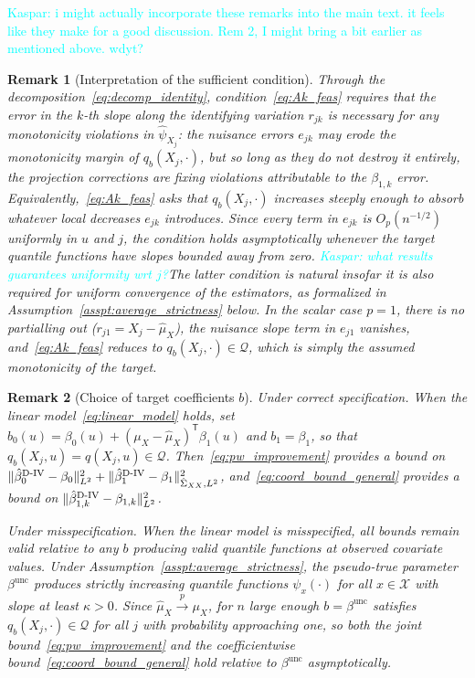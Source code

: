 \documentclass[12pt]{article}
\newcommand{\kw}[1]{\textcolor{cyan}{Kaspar: #1}}
\newcommand{\T}{\mathsf{T}} %
\newcommand{\est}{\ensuremath{\textnormal{D-IV}}\xspace}
\newcommand{\toP}{ \overset{p}{\to}}
\newtheorem{remark}{Remark}
\begin{document}
\kw{i might actually incorporate these remarks into the main text. it feels like they make for a good discussion. Rem 2, I might bring a bit earlier as mentioned above. wdyt?}
\begin{remark}[Interpretation of the sufficient condition]
\label{rem:coord_interpretation}
Through the decomposition~\eqref{eq:decomp_identity}, condition~\eqref{eq:Ak_feas} requires that the error in the $k$-th slope along the identifying variation $r_{jk}$ is \emph{necessary} for any monotonicity violations in $\hat\psi_{X_j}$: the nuisance errors $e_{jk}$ may erode the monotonicity margin of $q_b(X_j,\cdot)$, but so long as they do not destroy it entirely, the projection corrections are fixing violations attributable to the $\beta_{1,k}$ error. Equivalently,~\eqref{eq:Ak_feas} asks that $q_b(X_j,\cdot)$ increases steeply enough to absorb whatever local decreases $e_{jk}$ introduces. Since every term in $e_{jk}$ is $O_p(n^{-1/2})$ uniformly in $u$ and $j$, the condition holds asymptotically whenever the target quantile functions have slopes bounded away from zero. \kw{what results guarantees uniformity wrt $j$?}The latter condition is natural insofar it is also required for uniform convergence of the estimators, as formalized in Assumption~\ref{asspt:average_strictness} below. In the scalar case $p=1$, there is no partialling out ($r_{j1}=X_j-\hat\mu_X$), the nuisance slope term in $e_{j1}$ vanishes, and~\eqref{eq:Ak_feas} reduces to $q_b(X_j,\cdot)\in\mathcal Q$, which is simply the assumed monotonicity of the target.
\end{remark}


\begin{remark}[Choice of target coefficients $b$]
\label{rem:choice_of_reference} 
\emph{Under correct specification.}
When the linear model~\eqref{eq:linear_model} holds, set $b_0(u)=\beta_0(u)+(\mu_X-\hat\mu_X)^{\!\T}\beta_1(u)$ and $b_1=\beta_1$, so that $q_b(X_j,u)=q(X_j,u)\in\mathcal Q$. Then~\eqref{eq:pw_improvement} provides a bound on $\|\hat\beta_0^{\est}-\beta_0\|_{L^2}^2+\|\hat\beta_1^{\est}-\beta_1\|_{\hat\Sigma_{XX},L^2}^2$, and~\eqref{eq:coord_bound_general} provides a bound on $\|\hat\beta_{1,k}^{\est}-\beta_{1,k}\|_{L^2}^2$.

\emph{Under misspecification.}
When the linear model is misspecified, all bounds remain valid relative to any $b$ producing valid quantile functions at observed covariate values. Under Assumption~\ref{asspt:average_strictness}, the pseudo-true parameter $\beta^{\mathrm{unc}}$ produces strictly increasing quantile functions $\psi_x(\cdot)$ for all $x\in\mathcal X$ with slope at least $\kappa>0$. Since $\hat\mu_X\toP\mu_X$, for $n$ large enough $b=\beta^{\mathrm{unc}}$  satisfies $q_b(X_j,\cdot)\in\mathcal Q$ for all $j$ with probability approaching one, so both the joint bound~\eqref{eq:pw_improvement} and the coefficientwise bound~\eqref{eq:coord_bound_general} hold relative to $\beta^{\mathrm{unc}}$ asymptotically.
\end{remark}
\end{document}
